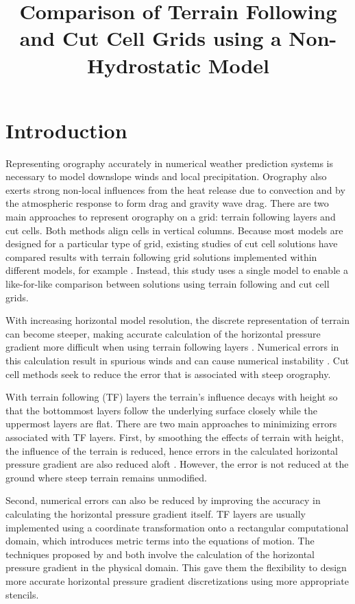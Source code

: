 \documentclass[twocol]{ametsoc}
\title{Comparison of Terrain Following and Cut Cell Grids using a Non-Hydrostatic Model}
\affiliation{Department of Meteorology, University of Reading, Reading, United Kingdom}
\begin{document}
\maketitle

\section{Introduction}
Representing orography accurately in numerical weather prediction systems is necessary to model downslope winds and local precipitation.  Orography also exerts strong non-local influences from the heat release due to convection and by the atmospheric response to form drag and gravity wave drag.  There are two main approaches to represent orography on a grid: terrain following layers and cut cells.  Both methods align cells in vertical columns.  Because most models are designed for a particular type of grid, existing studies of cut cell solutions have compared results with terrain following grid solutions implemented within different models, for example \citet{good2014}.  Instead, this study uses a single model to enable a like-for-like comparison between solutions using terrain following and cut cell grids.

With increasing horizontal model resolution, the discrete representation of terrain can become steeper, making accurate calculation of the horizontal pressure gradient more difficult when using terrain following layers \citep{gary1973,steppeler2002}.  Numerical errors in this calculation result in spurious winds and can cause numerical instability \citep{fast2003,webster2003}.  Cut cell methods seek to reduce the error that is associated with steep orography.

With terrain following (TF) layers the terrain's influence decays with height so that the bottommost layers follow the underlying surface closely while the uppermost layers are flat.  There are two main approaches to minimizing errors associated with TF layers.  First, by smoothing the effects of terrain with height, the influence of the terrain is reduced, hence errors in the calculated horizontal pressure gradient are also reduced aloft \citep{schaer2002,leuenberger2010,klemp2011}.  However, the error is not reduced at the ground where steep terrain remains unmodified.

Second, numerical errors can also be reduced by improving the accuracy in calculating the horizontal pressure gradient itself.  TF layers are usually implemented using a coordinate transformation onto a rectangular computational domain, which introduces metric terms into the equations of motion.  The techniques proposed by \citet{klemp2011} and \cite{zaengl2012} both involve the calculation of the horizontal pressure gradient in the physical domain.  This gave them the flexibility to design more accurate horizontal pressure gradient discretizations using more appropriate stencils.
\end{document}
